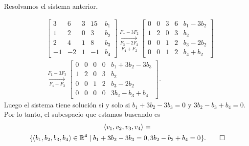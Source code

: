 \documentclass{beamer} %
\begin{document}
    \begin{frame}
    
    Resolvamos  el sistema anterior.  \pause

    \begin{align*}
        &\left[\begin{array}{cccc|c}
        3&6&3&15&b_1\\
        1&2&0&3&b_2\\
        2&4&1&8&b_3\\
        -1&-2&1&-1&b_4
        \end{array}\right] 
        \underset{F_4+F_2}{\underset{F_3-2F_2}{\stackrel{F1-3F_2}{\longrightarrow}}} 
        \left[\begin{array}{cccc|c}
        0&0&3&6&b_1-3b_2\\
        1&2&0&3&b_2\\
        0&0&1&2&b_3-2b_2\\
        0&0&1&2&b_4+b_2
        \end{array}\right] \\
        &\underset{F_4-F_3}{\stackrel{F_1-3F_3}{\longrightarrow}}
        \left[\begin{array}{cccc|c}
        0&0&0&0&b_1+3b_2-3b_3\\
        1&2&0&3&b_2\\
        0&0&1&2&b_3-2b_2\\
        0&0&0&0&3b_2-b_3+b_4
        \end{array}\right].
    \end{align*}
    \pause Luego el sistema tiene solución si y solo si $b_1+3b_2-3b_3=0$ y $3b_2-b_3+b_4=0$. Por lo tanto, el subespacio que estamos buscando es
    \begin{multline*}
        \langle v_1, v_2, v_3, v_4\rangle=\\\{(b_1,b_2,b_3,b_4)\in\mathbb{R}^4\mid b_1+3b_2-3b_3=0,3b_2-b_3+b_4=0\}.\qed
    \end{multline*}
    
    \end{frame}
    
    
    
\end{document}
